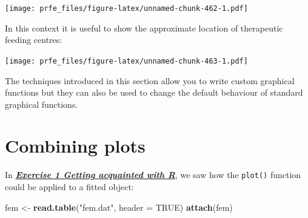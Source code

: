 \documentclass[12pt,a4paper]{book}
\newenvironment{Shaded}{\begin{snugshade}}{\end{snugshade}}
\newcommand{\DataTypeTok}[1]{\textcolor[rgb]{0.13,0.29,0.53}{#1}}
\newcommand{\DecValTok}[1]{\textcolor[rgb]{0.00,0.00,0.81}{#1}}
\newcommand{\FloatTok}[1]{\textcolor[rgb]{0.00,0.00,0.81}{#1}}
\newcommand{\KeywordTok}[1]{\textcolor[rgb]{0.13,0.29,0.53}{\textbf{#1}}}
\newcommand{\NormalTok}[1]{#1}
\newcommand{\OperatorTok}[1]{\textcolor[rgb]{0.81,0.36,0.00}{\textbf{#1}}}
\newcommand{\OtherTok}[1]{\textcolor[rgb]{0.56,0.35,0.01}{#1}}
\newcommand{\StringTok}[1]{\textcolor[rgb]{0.31,0.60,0.02}{#1}}
\theoremstyle{definition}
\theoremstyle{definition}
\theoremstyle{definition}
\theoremstyle{remark}
\begin{document}
\texttt{[image: prfe\_files/figure-latex/unnamed-chunk-462-1.pdf]}

In this context it is useful to show the approximate location of
therapeutic feeding centres:

\begin{Shaded}
\end{Shaded}

\texttt{[image: prfe\_files/figure-latex/unnamed-chunk-463-1.pdf]}

The techniques introduced in this section allow you to write custom
graphical functions but they can also be used to change the default
behaviour of standard graphical functions.

\hypertarget{combining-plots}{%
\section{Combining plots}\label{combining-plots}}

In \protect\hyperlink{exercise1}{\textbf{\emph{Exercise 1 Getting
acquainted with R}}}, we saw how the \texttt{plot()} function could be
applied to a fitted object:

\begin{Shaded}
\begin{Highlighting}[]
\NormalTok{fem <-}\StringTok{ }\KeywordTok{read.table}\NormalTok{(}\StringTok{"fem.dat"}\NormalTok{, }\DataTypeTok{header =} \OtherTok{TRUE}\NormalTok{)}
\KeywordTok{attach}\NormalTok{(fem)}
\end{Highlighting}
\end{Shaded}
\end{document}
